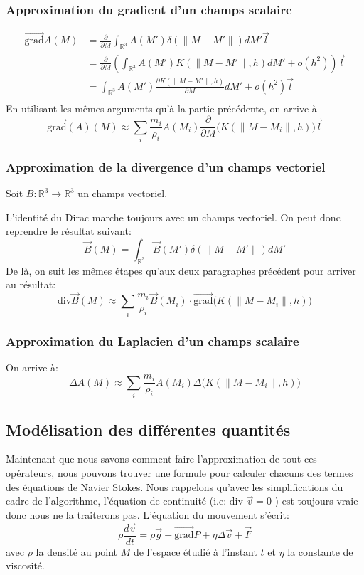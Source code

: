 \documentclass[a4paper,10pt]{report}
\begin{document}
\newpage

\subsubsection{Approximation du gradient d'un champs scalaire}
\begin{align*}
 \vec{\text{grad}}A(M) &= \frac{\partial}{\partial M}\int_{\mathbb{R}^3} A(M')\delta(\lVert M - M' \rVert)dM' \vec{l} \\
      &= \frac{\partial}{\partial M}\left (\int_{\mathbb{R}^3} A(M') K(\lVert M - M' \rVert, h)dM' + o(h^2) \right) \vec{l}\\
      &= \int_{\mathbb{R}^3} A(M')\frac{\partial K(\lVert M - M' \rVert, h)}{\partial M}dM' +o(h^2) \vec{l}\\
\end{align*}
En utilisant les mêmes arguments qu'à la partie précédente, on arrive à
$$
\boxed{ \vec{\text{grad}}(A)(M) \approx \sum_i \frac{m_i}{\rho_i}A(M_i) \frac{\partial}{\partial M} \biggl( K(\lVert M - M_i \rVert, h) \biggl ) \vec{l}}
$$

\subsubsection{Approximation de la divergence d'un champs vectoriel}
Soit $B : \mathbb{R}^3 \to \mathbb{R}^3$ un champs vectoriel.

L'identité du Dirac marche toujours avec un champs vectoriel. On peut donc reprendre le résultat  suivant:
$$\vec{B}(M) = \int_{\mathbb{R}^3} \vec{B}(M')\delta(\lVert M - M' \rVert)dM'$$
De là, on suit les mêmes étapes qu'aux deux paragraphes précédent pour arriver au résultat:
$$
\boxed{ \text{div}\vec{B}(M) \approx \sum_i \frac{m_i}{\rho_i}\vec{B}(M_i) \cdot \vec{\text{grad}} \biggl(K(\lVert M - M_i \rVert, h)\biggl) }
$$

\subsubsection{Approximation du Laplacien d'un champs scalaire}
On arrive à:
$$
\boxed{ \Delta A (M) \approx \sum_i \frac{m_i}{\rho_i}A(M_i) \Delta \biggl(K(\lVert M - M_i \rVert, h)\biggl) }
$$

\subsection{Modélisation des différentes quantités}
Maintenant que nous savons comment faire l'approximation de tout ces opérateurs, nous pouvons trouver une formule pour calculer chacuns des termes des équations de Navier Stokes. Nous rappelons qu'avec les simplifications du cadre de l'algorithme, l'équation de continuité (i.e: $\text{div } \vec{v} = 0$ ) est toujours vraie donc nous ne la traiterons pas. L'équation du mouvement s'écrit:
$$
\rho \frac{d\vec{v}}{dt} = \rho \vec{g} - \vec{\text{grad}} P + \eta \Delta \vec{v} + \vec{F}
$$
avec $\rho$ la densité au point $M$ de l'espace étudié à l'instant $t$ et $\eta$ la constante de viscosité.
\end{document}
